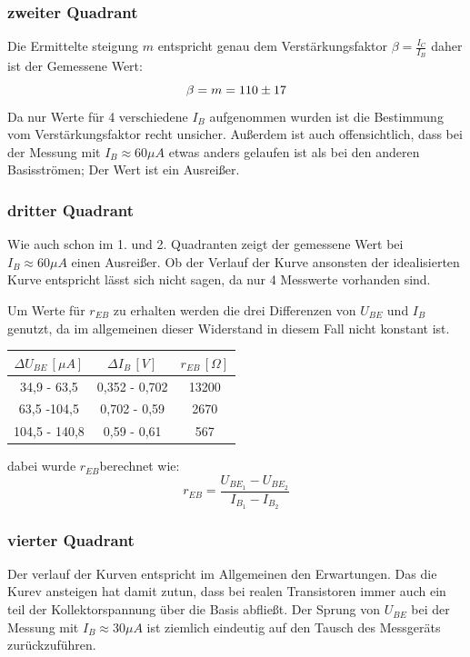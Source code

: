 \subsubsection{zweiter Quadrant}
Die Ermittelte steigung \(m\) entspricht genau dem Verstärkungsfaktor \(\beta = \frac{I_C}{I_B}\) daher ist der Gemessene Wert:
\begin{equation}
\beta = m = 110 \pm 17 \notag
\end{equation}
Da nur Werte für 4 verschiedene \(I_{B}\) aufgenommen wurden ist die Bestimmung vom Verstärkungsfaktor recht unsicher. Außerdem ist auch offensichtlich, dass bei der Messung mit \(I_B \approx 60 \mu A\) etwas anders gelaufen ist als bei den anderen Basisströmen; Der Wert ist ein Ausreißer.
\subsubsection{dritter Quadrant}
Wie auch schon im 1. und 2. Quadranten zeigt der gemessene Wert bei \(I_B \approx 60 \mu A\) einen Ausreißer. Ob der Verlauf der Kurve ansonsten der idealisierten Kurve entspricht lässt sich nicht sagen, da nur 4 Messwerte vorhanden sind.  

Um Werte für \(r_{EB}\) zu erhalten werden die drei Differenzen von \(U_{BE}\) und \(I_{B}\) genutzt, da im allgemeinen dieser Widerstand in diesem Fall nicht konstant ist.
\begin{center}
\begin{tabular}{c|c|c}
\(\Delta U_{BE}\, [\mu A]\) & \(\Delta I_B\, [V]\) &  \(r_{EB}\, [\Omega]\) \\\hline
34,9 - 63,5 & 0,352 - 0,702 & 13200\\
63,5 -104,5 & 0,702 - 0,59 & 2670\\
104,5 - 140,8 & 0,59 - 0,61 & 567
\end{tabular}
\end{center}
dabei wurde \(r_{EB}\)berechnet wie:
\begin{equation}
r_{EB} = \frac{U_{BE_1}-U_{BE_2}}{I_{B_1}-I_{B_2}}
\end{equation}
\subsubsection{vierter Quadrant}
Der verlauf der Kurven entspricht im Allgemeinen den Erwartungen. Das die Kurev ansteigen hat damit zutun, dass bei realen Transistoren immer auch ein teil der Kollektorspannung über die Basis abfließt. Der Sprung von \(U_{BE}\) bei der Messung mit \(I_B \approx 30 \mu A\) ist ziemlich eindeutig auf den Tausch des Messgeräts zurückzuführen.